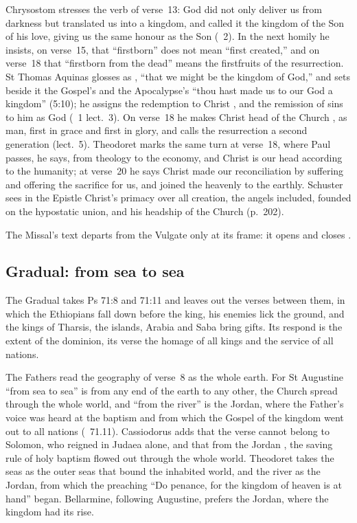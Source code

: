 Chrysostom stresses the verb of verse~13: God did not only deliver us from
darkness but translated us into a kingdom, and called it the kingdom of the
Son of his love, giving us the same honour as the Son (\ 2). In the next homily he insists, on verse~15, that ``firstborn'' does not mean ``first
created,'' and on verse~18 that ``firstborn from the dead'' means the
firstfruits of the resurrection. St Thomas Aquinas glosses 
as , ``that we might be the kingdom of God,'' and
sets beside it the Gospel's  and the
Apocalypse's ``thou hast made us to our God a kingdom'' (5:10); he assigns the
redemption to Christ , and the remission of sins to him as God (\ 1
lect.~3). On verse~18 he makes Christ head of the Church , as man, first in grace and first in glory, and calls the
resurrection a second generation (lect.~5). Theodoret marks the same turn at
verse~18, where Paul passes, he says, from theology to the economy, and Christ
is our head according to the humanity; at verse~20 he says Christ made our
reconciliation by suffering and offering the sacrifice for us, and joined the
heavenly to the earthly. Schuster sees in the Epistle Christ's primacy over all
creation, the angels included, founded on the hypostatic union, and his
headship of the Church (p.~202).

The Missal's text departs from the Vulgate only at its frame: it opens
 and closes .

\subsection{Gradual: from sea to sea}
\label{sec:element-gradual}

The Gradual takes Ps 71:8 and 71:11 and leaves out the verses between them,
in which the Ethiopians fall down before the king, his enemies lick the
ground, and the kings of Tharsis, the islands, Arabia and Saba bring gifts.
Its respond is the extent of the dominion, its verse the homage of all kings
and the service of all nations.

The Fathers read the geography of verse~8 as the whole earth. For St Augustine
``from sea to sea'' is from any end of the earth to any other, the Church
spread through the whole world, and ``from the river'' is the Jordan, where
the Father's voice was heard at the baptism and from which the Gospel of the
kingdom went out to all nations (\ 71.11). Cassiodorus adds
that the verse cannot belong to Solomon, who reigned in Judaea alone, and that
from the Jordan , the saving rule of holy baptism flowed out through the
whole world. Theodoret takes the seas as the outer seas that bound the
inhabited world, and the river as the Jordan, from which the preaching ``Do
penance, for the kingdom of heaven is at hand'' began. Bellarmine, following
Augustine, prefers the Jordan, where the kingdom had its rise.

